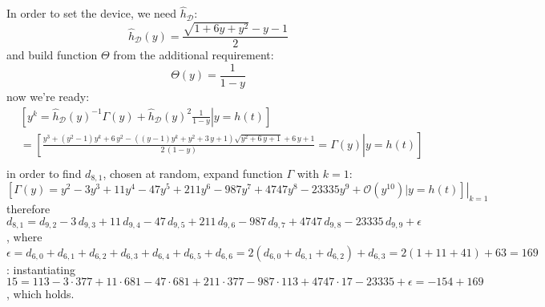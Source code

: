 In order to set the device, we need $\hat{h}_{\mathcal{D}}$:
\begin{displaymath} 
    \hat{h}_{\mathcal{D}}(y) = \frac{\sqrt{1+6y+y^2}-y-1}{2}
\end{displaymath} 
and build function $\Theta$ from the additional requirement:
\begin{displaymath} 
    \Theta(y) = \frac{1}{1-y}
\end{displaymath} 
now we're ready:
\begin{displaymath}
\begin{split}
    &\left.\left[y^{k} = \hat{h}_{\mathcal{D}}(y)^{-1} \Gamma(y) + 
        \hat{h}_{\mathcal{D}}(y)^{2}\frac{1}{1-y} \right| y = h(t) \right]\\
    &=\left.\left[\frac{y^{3} + {\left(y^{2} - 1\right)} y^{k} + 6 \, y^{2} - {\left({\left(y - 1\right)} y^{k} + y^{2} + 3 \, y + 1\right)} \sqrt{y^{2} + 6 \, y + 1} + 6 \, y + 1}{2 \, {\left(1-y\right)}}=\Gamma(y) \right| y = h(t) \right]\\
\end{split}
\end{displaymath}
in order to find $d_{8,1}$, chosen at random, expand function $\Gamma$ with $k=1$:
\begin{displaymath}
    \left.\left[\Gamma(y)=y^2 -3y^3 + 11y^4  -47y^5 + 211y^6 -987y^7 + 4747y^8 
        -23335y^9 + \mathcal{O}(y^{10}) \big| y = h(t) \right]\right|_{k=1}
\end{displaymath}
therefore $d_{8,1}=d_{9,2} -3\,d_{9,3} +11\,d_{9,4}-47\,d_{9,5} 
    +211\,d_{9,6} -987\,d_{9,7} +4747\,d_{9,8}-23335\,d_{9,9}+\epsilon$,
    where $\epsilon = d_{6,0}+d_{6,1}+d_{6,2}+d_{6,3}+d_{6,4}+d_{6,5}+d_{6,6} = 
            2(d_{6,0}+d_{6,1}+d_{6,2})+d_{6,3} = 2(1 + 11 + 41) + 63 = 169$: 
    instantiating $15 = 113 -3\cdot377 +11\cdot681 -47\cdot681 +211\cdot377
        -987\cdot113 +4747\cdot17 -23335 + \epsilon = -154 + 169$, which holds.

